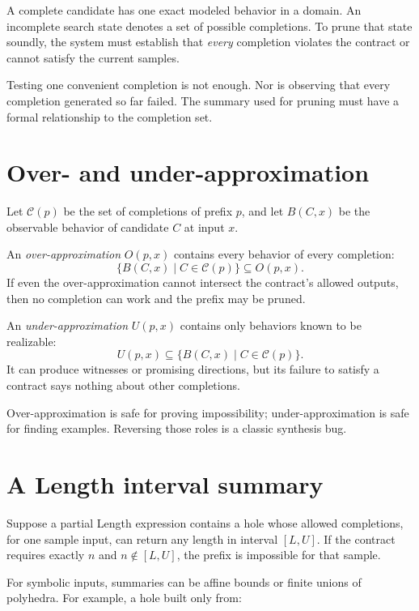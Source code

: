 \documentclass[10pt,letterpaper,oneside]{report}
\begin{document}
A complete candidate has one exact modeled behavior in a domain. An incomplete search state denotes a set of possible completions. To prune that state soundly, the system must establish that \emph{every} completion violates the contract or cannot satisfy the current samples.

Testing one convenient completion is not enough. Nor is observing that every completion generated so far failed. The summary used for pruning must have a formal relationship to the completion set.

\section{Over- and under-approximation}

Let $\mathcal{C}(p)$ be the set of completions of prefix $p$, and let $B(C,x)$ be the observable behavior of candidate $C$ at input $x$.

An \emph{over-approximation} $O(p,x)$ contains every behavior of every completion:
\[
  \{B(C,x)\mid C\in\mathcal{C}(p)\}\subseteq O(p,x).
\]
If even the over-approximation cannot intersect the contract's allowed outputs, then no completion can work and the prefix may be pruned.

An \emph{under-approximation} $U(p,x)$ contains only behaviors known to be realizable:
\[
  U(p,x)\subseteq
  \{B(C,x)\mid C\in\mathcal{C}(p)\}.
\]
It can produce witnesses or promising directions, but its failure to satisfy a contract says nothing about other completions.

\begin{mentalmodel}
Over-approximation is safe for proving impossibility; under-approximation is safe for finding examples. Reversing those roles is a classic synthesis bug.
\end{mentalmodel}

\section{A Length interval summary}

Suppose a partial Length expression contains a hole whose allowed completions, for one sample input, can return any length in interval $[L,U]$. If the contract requires exactly $n$ and $n\notin[L,U]$, the prefix is impossible for that sample.

For symbolic inputs, summaries can be affine bounds or finite unions of polyhedra. For example, a hole built only from:
\end{document}
